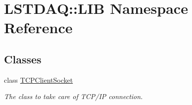 \hypertarget{namespaceLSTDAQ_1_1LIB}{}\section{L\+S\+T\+D\+AQ\+:\+:L\+IB Namespace Reference}
\label{namespaceLSTDAQ_1_1LIB}
\subsection*{Classes}
\begin{DoxyCompactItemize}
\item 
class \hyperlink{classLSTDAQ_1_1LIB_1_1TCPClientSocket}{T\+C\+P\+Client\+Socket}
\begin{DoxyCompactList}\small\item\em The class to take care of T\+C\+P/\+IP connection. \end{DoxyCompactList}\end{DoxyCompactItemize}
